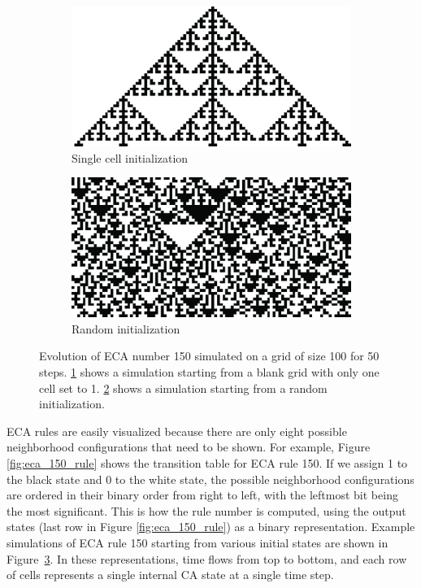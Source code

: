 \begin{figure}[htbp]
  \centering
\begin{subfigure}[b]{.45\linewidth}
  \centering
  \includegraphics[width=\linewidth]{figures/eca_150_single.pdf}
  \caption{Single cell initialization}
  \label{fig:eca_150_single}
\end{subfigure}
\begin{subfigure}[b]{.45\linewidth}
  \centering
  \includegraphics[width=\linewidth]{figures/eca_150_random.pdf}
  \caption{Random initialization}
  \label{fig:eca_150_random}
\end{subfigure}
\caption{Evolution of \ac{ECA} number 150 simulated on a grid of size 100 for 50
  steps. \ref{fig:eca_150_single} shows a simulation starting from a blank grid
  with only one cell set to 1. \ref{fig:eca_150_random} shows a simulation
  starting from a random initialization.}
  \label{fig:eca_150}
\end{figure}


\ac{ECA} rules are easily visualized because there are only eight possible
neighborhood configurations that need to be shown. For example, Figure
\ref{fig:eca_150_rule} shows the transition table for \ac{ECA} rule 150. If we
assign 1 to the black state and 0 to the white state, the possible neighborhood
configurations are ordered in their binary order from right to left, with the
leftmost bit being the most significant. This is how the rule number is
computed, using the output states (last row in Figure \ref{fig:eca_150_rule}) as
a binary representation. Example simulations of \ac{ECA} rule 150 starting 
from various initial states are shown in Figure~\ref{fig:eca_150}. In these 
representations, time flows from top to bottom, and each row of cells represents 
a single internal \ac{CA} state at a single time step.

